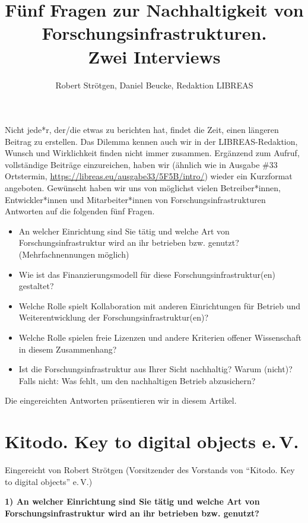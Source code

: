 \documentclass[a4paper,
fontsize=11pt,
oneside,
numbers=noperiodatend,
parskip=half-,
bibliography=totoc,
final
]{scrartcl}
\title{\LARGE{Fünf Fragen zur Nachhaltigkeit von Forschungsinfrastrukturen.\\ Zwei Interviews}} %
\author{Robert Strötgen, Daniel Beucke, Redaktion LIBREAS} %
\date{}
\begin{document}
\maketitle
\thispagestyle{fancyplain} 


Nicht jede*r, der/die etwas zu berichten hat, findet die Zeit, einen
längeren Beitrag zu erstellen. Das Dilemma kennen auch wir in der
LIBREAS-Redaktion, Wunsch und Wirklichkeit finden nicht immer zusammen.
Ergänzend zum Aufruf, vollständige Beiträge einzureichen, haben wir
(ähnlich wie in Ausgabe \#33 Ortstermin,
\url{https://libreas.eu/ausgabe33/5F5B/intro/}) wieder ein Kurzformat
angeboten. Gewünscht haben wir uns von möglichst vielen Betreiber*innen,
Entwickler*innen und Mitarbeiter*innen von Forschungsinfrastrukturen
Antworten auf die folgenden fünf Fragen.

\begin{itemize}
\item
  An welcher Einrichtung sind Sie tätig und welche Art von
  Forschungsinfrastruktur wird an ihr betrieben bzw. genutzt?
  (Mehrfachnennungen möglich)
\item
  Wie ist das Finanzierungsmodell für diese Forschungsinfrastruktur(en)
  gestaltet?
\item
  Welche Rolle spielt Kollaboration mit anderen Einrichtungen für
  Betrieb und Weiterentwicklung der Forschungsinfrastruktur(en)?
\item
  Welche Rolle spielen freie Lizenzen und andere Kriterien offener
  Wissenschaft in diesem Zusammenhang?
\item
  Ist die Forschungsinfrastruktur aus Ihrer Sicht nachhaltig? Warum
  (nicht)? Falls nicht: Was fehlt, um den nachhaltigen Betrieb
  abzusichern?
\end{itemize}

Die eingereichten Antworten präsentieren wir in diesem Artikel.

\hypertarget{kitodo.-key-to-digital-objects-e.-v.}{%
\section{Kitodo. Key to digital objects e.\,V.}\label{kitodo.-key-to-digital-objects-e.-v.}}

Eingereicht von Robert Strötgen (Vorsitzender des Vorstands von
\enquote{Kitodo. Key to digital objects} e.\,V.)

\textbf{1) An welcher Einrichtung sind Sie tätig und welche Art von
Forschungsinfrastruktur wird an ihr betrieben bzw. genutzt?}
\end{document}
